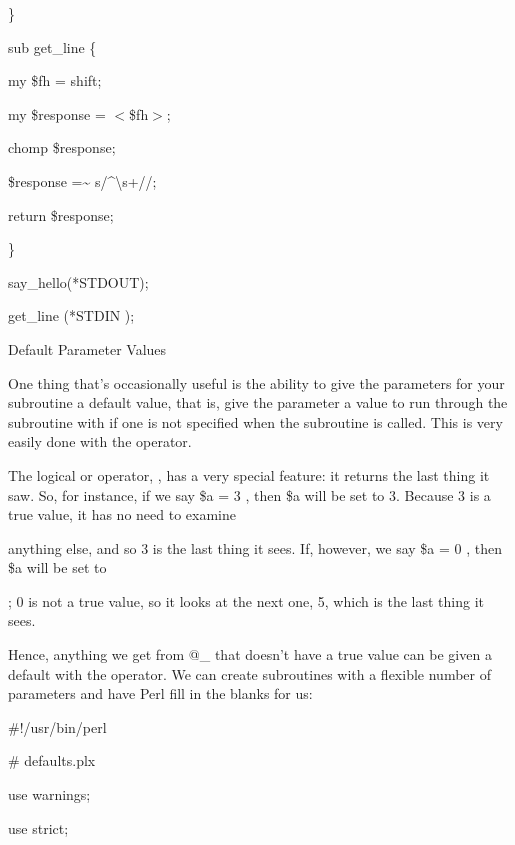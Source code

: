 \documentclass[a4paper,11pt]{book}
\begin{document}
\noindent \}

\noindent sub get\_line \{

\noindent my \$fh = shift;

\noindent my \$response = $<$\$fh$>$;

\noindent chomp \$response;

\noindent \$response =\~{} s/\^{}\textbackslash s+//;

\noindent return \$response;

\noindent \}

\noindent 

\noindent say\_hello(*STDOUT);

\noindent get\_line (*STDIN );

\noindent 

\noindent 

\noindent Default Parameter Values

\noindent 

\noindent One thing that's occasionally useful is the ability to give the parameters for your subroutine a default value, that is, give the parameter a value to run through the subroutine with if one is not specified when the subroutine is called. This is very easily done with the \textbar \textbar  operator.

\noindent 

\noindent The logical or operator, \textbar \textbar , has a very special feature: it returns the last thing it saw. So, for instance, if we say \$a = 3 \textbar {}, then \$a will be set to 3. Because 3 is a true value, it has no need to examine

\noindent anything else, and so 3 is the last thing it sees. If, however, we say \$a = 0 \textbar {}, then \$a will be set to

; 0 is not a true value, so it looks at the next one, 5, which is the last thing it sees.

\noindent 

\noindent Hence, anything we get from @\_ that doesn't have a true value can be given a default with the \textbar \textbar  operator. We can create subroutines with a flexible number of parameters and have Perl fill in the blanks for us:

\noindent 

\noindent \#!/usr/bin/perl

\noindent \# defaults.plx

\noindent use warnings;

\noindent use strict;
\end{document}
